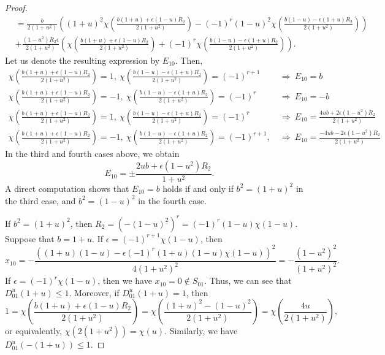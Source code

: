\documentclass[10pt,a4paper]{amsart}
\begin{document}
\begin{proof}
\begin{align*}
	&=\frac{b}{2(1+u^2)}\left(  (1+u)^2\chi\left( \frac{ b(1+u)+\epsilon(1-u)R_2}{2(1+u^2)}\right) -(-1)^r(1-u)^2\chi\left( \frac{ b(1-u)-\epsilon(1+u)R_2}{2(1+u^2)}\right) \right) \\
	&+\frac{(1-u^2)R_2 \epsilon}{2(1+u^2)}\left(  \chi\left( \frac{ b(1+u)+\epsilon(1-u)R_2}{2(1+u^2)}\right) +(-1)^r\chi\left( \frac{ b(1-u)-\epsilon(1+u)R_2}{2(1+u^2)}\right) \right).
\end{align*}
Let us denote the resulting expression by $E_{10}$. Then,
\begin{align*}
	\chi\left( \frac{ b(1+u)+\epsilon(1-u)R_2}{2(1+u^2)}\right)=1, \ \chi\left( \frac{ b(1-u)-\epsilon(1+u)R_2}{2(1+u^2)}\right) = (-1)^{r+1}\ &\Rightarrow\ E_{10}=b\\
	\chi\left( \frac{ b(1+u)+\epsilon(1-u)R_2}{2(1+u^2)}\right)=-1, \ \chi\left( \frac{ b(1-u)-\epsilon(1+u)R_2}{2(1+u^2)}\right) = (-1)^r\  &\Rightarrow\ E_{10}=-b\\
	\chi\left( \frac{ b(1+u)+\epsilon(1-u)R_2}{2(1+u^2)}\right)=1,\ \chi\left( \frac{ b(1-u)-\epsilon(1+u)R_2}{2(1+u^2)}\right) = (-1)^r\ &\Rightarrow\ E_{10}=\frac{4ub+2\epsilon (1-u^2)R_2}{2(1+u^2)}\\
	\chi\left( \frac{ b(1+u)+\epsilon (1-u)R_2}{2(1+u^2)}\right)=-1,\ \chi\left( \frac{ b(1-u)-\epsilon (1+u)R_2}{2(1+u^2)}\right) = (-1)^{r+1},\ &\Rightarrow\ E_{10}=\frac{-4ub- 2\epsilon (1-u^2)R_2}{2(1+u^2)}
\end{align*}
In the third and fourth cases above, we obtain
\[
E_{10}=\pm \frac{2ub+\epsilon(1-u^2)R_2}{1+u^2}.
\]
A direct computation shows that $E_{10}=b$ holds if and only if
$b^2=(1+u)^2$ in the third case, and $b^2=(1-u)^2$ in the fourth case.


If $b^2 = (1+u)^2$, then $R_2=(-(1-u)^2)^r=(-1)^r (1-u)\chi(1-u)$. Suppose that $b=1+u$. If $\epsilon = (-1)^{r+1} \chi(1-u)$, then
\begin{equation*}
	x_{10} = -\frac{\left( (1+u)(1-u)-\epsilon (-1)^r(1+u)(1-u)\chi(1-u)\right)^2}{4(1+u^2)^2} = -\frac{(1-u^2)^2}{(1+u^2)^2}.
\end{equation*}
If $\epsilon = (-1)^{r} \chi(1-u)$, then we have $x_{10}=0\not \in S_{01}$. Thus, we can see that $D_{01}^u(1+u)\le 1$. Moreover, if $D_{01}^u(1+u)= 1$, then
\begin{equation*}
	1=\chi\left(\frac{ b(1+u)+\epsilon(1-u)R_2}{2(1+u^2)}\right)=\chi\left( \frac{ (1+u)^2-(1-u)^2}{2(1+u^2)}\right) = \chi\left( \frac{4u}{2(1+u^2)}\right), 
\end{equation*}
or equivalently, $\chi(2(1+u^2))=\chi(u)$. Similarly, we have $D_{01}^u(-(1+u))\le 1$.


\end{proof}
\end{document}
